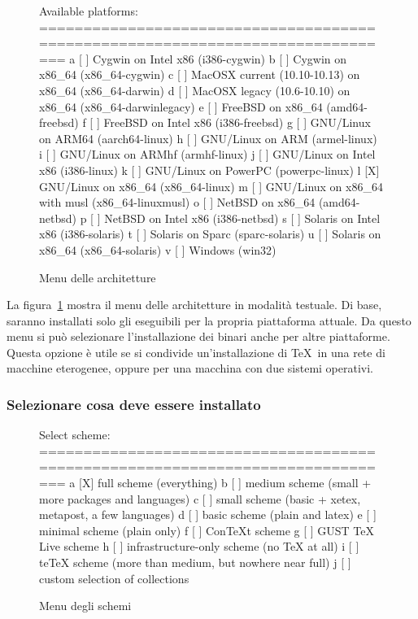 \documentclass{article}
\begin{document}
\begin{figure}[tb]
\begin{boxedverbatim}
Available platforms:
===============================================================================
   a [ ] Cygwin on Intel x86 (i386-cygwin)
   b [ ] Cygwin on x86_64 (x86_64-cygwin)
   c [ ] MacOSX current (10.10-10.13) on x86_64 (x86_64-darwin)
   d [ ] MacOSX legacy (10.6-10.10) on x86_64 (x86_64-darwinlegacy)
   e [ ] FreeBSD on x86_64 (amd64-freebsd)
   f [ ] FreeBSD on Intel x86 (i386-freebsd)
   g [ ] GNU/Linux on ARM64 (aarch64-linux)
   h [ ] GNU/Linux on ARM (armel-linux)
   i [ ] GNU/Linux on ARMhf (armhf-linux)
   j [ ] GNU/Linux on Intel x86 (i386-linux)
   k [ ] GNU/Linux on PowerPC (powerpc-linux)
   l [X] GNU/Linux on x86_64 (x86_64-linux)
   m [ ] GNU/Linux on x86_64 with musl (x86_64-linuxmusl)
   o [ ] NetBSD on x86_64 (amd64-netbsd)
   p [ ] NetBSD on Intel x86 (i386-netbsd)
   s [ ] Solaris on Intel x86 (i386-solaris)
   t [ ] Solaris on Sparc (sparc-solaris)
   u [ ] Solaris on x86_64 (x86_64-solaris)
   v [ ] Windows (win32)
\end{boxedverbatim}
\caption{Menu delle architetture}\label{fig:bin-text}
\end{figure}

La figura~\ref{fig:bin-text} mostra il menu delle architetture in modalità
testuale. Di base, saranno installati solo gli eseguibili per la propria
piattaforma attuale. Da questo menu si può selezionare l'installazione
dei binari anche per altre piattaforme. Questa opzione è utile se si
condivide un'installazione di \TeX\ in una rete di macchine eterogenee,
oppure per una macchina con due sistemi operativi.

\subsubsection{Selezionare cosa deve essere installato}
\label{sec:components}

\begin{figure}[tbh]
\begin{boxedverbatim}
Select scheme:
===============================================================================
 a [X] full scheme (everything)
 b [ ] medium scheme (small + more packages and languages)
 c [ ] small scheme (basic + xetex, metapost, a few languages)
 d [ ] basic scheme (plain and latex)
 e [ ] minimal scheme (plain only)
 f [ ] ConTeXt scheme
 g [ ] GUST TeX Live scheme
 h [ ] infrastructure-only scheme (no TeX at all)
 i [ ] teTeX scheme (more than medium, but nowhere near full)
 j [ ] custom selection of collections
\end{boxedverbatim}
\caption{Menu degli schemi}\label{fig:scheme-text}
\end{figure}
\end{document}
